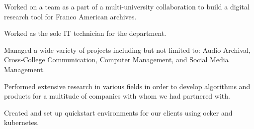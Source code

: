 \documentclass[letterpaper]{AMcEnaneyResume} %
\begin{document}
\begin{minipage}[t]{0.66\textwidth}
        \sectionspace %




        \begin{tightitemize}
            \item Worked on a team as a part of a multi-university collaboration to build a digital research tool for Franco American archives.
            \item Worked as the sole IT technician for the department.
            \item Managed a wide variety of projects including but not limited to: Audio Archival, Cross-College Communication, Computer Management, and Social Media Management.
        \end{tightitemize}

        \sectionspace %



        \begin{tightitemize}
            \item Performed extensive research in various fields in order to develop algorithms and products for a multitude of companies with whom we had partnered with.
            \item Created and set up quickstart environments for our clients using ocker and kubernetes.
        \end{tightitemize}

        \sectionspace %
        


\end{minipage} %
\end{document}
